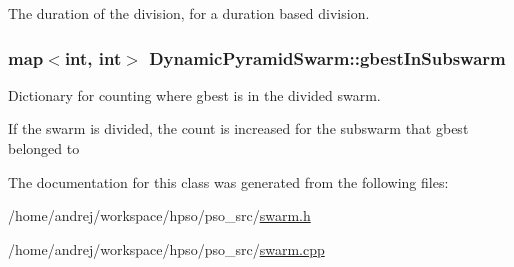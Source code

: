 The duration of the division, for a duration based division. 

\hypertarget{classDynamicPyramidSwarm_6251f69cae0650411648ce8d6de1bc2d}{
\subsubsection{\setlength{\rightskip}{0pt plus 5cm}map$<$int, int$>$ {\bf DynamicPyramidSwarm::gbestInSubswarm}}}
\label{classDynamicPyramidSwarm_6251f69cae0650411648ce8d6de1bc2d}


Dictionary for counting where gbest is in the divided swarm. 

If the swarm is divided, the count is increased for the subswarm that gbest belonged to 

The documentation for this class was generated from the following files:\begin{CompactItemize}
\item 
/home/andrej/workspace/hpso/pso\_\-src/\hyperlink{swarm_8h}{swarm.h}\item 
/home/andrej/workspace/hpso/pso\_\-src/\hyperlink{swarm_8cpp}{swarm.cpp}\end{CompactItemize}
